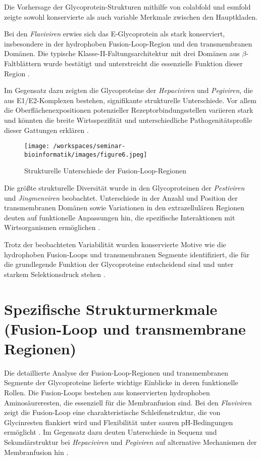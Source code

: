 Die Vorhersage der Glycoprotein-Strukturen mithilfe von \gls{colabfold} und \gls{esmfold} zeigte sowohl konservierte als auch variable Merkmale zwischen den Hauptkladen.

Bei den \textit{Flaviviren} erwies sich das E-Glycoprotein als stark konserviert, insbesondere in der hydrophoben Fusion-Loop-Region und den transmembranen Domänen. Die typische Klasse-II-Faltungsarchitektur mit drei Domänen aus $\beta$-Faltblättern wurde bestätigt und unterstreicht die essenzielle Funktion dieser Region \autocite{Modis2004}.

Im Gegensatz dazu zeigten die Glycoproteine der \textit{Hepaciviren} und \textit{Pegiviren}, die aus E1/E2-Komplexen bestehen, signifikante strukturelle Unterschiede. Vor allem die Oberflächenexpositionen potenzieller Rezeptorbindungsstellen variieren stark und könnten die breite Wirtsspezifität und unterschiedliche Pathogenitätsprofile dieser Gattungen erklären \autocite{Lavie2017}.

\begin{figure}[H]
    \centering
    \texttt{[image: /workspaces/seminar-bioinformatik/images/figure6.jpeg]}
    \caption{Strukturelle Unterschiede der Fusion-Loop-Regionen}
    \label{fig:figure6-orginal}
\end{figure}

Die größte strukturelle Diversität wurde in den Glycoproteinen der \textit{Pestiviren} und \textit{Jingmenviren} beobachtet. Unterschiede in der Anzahl und Position der transmembranen Domänen sowie Variationen in den extrazellulären Regionen deuten auf funktionelle Anpassungen hin, die spezifische Interaktionen mit Wirtsorganismen ermöglichen \autocite{Tautz2015}.

Trotz der beobachteten Variabilität wurden konservierte Motive wie die hydrophoben Fusion-Loops und transmembranen Segmente identifiziert, die für die grundlegende Funktion der Glycoproteine entscheidend sind und unter starkem Selektionsdruck stehen \autocite{Modis2004}.

\section{Spezifische Strukturmerkmale (Fusion-Loop und transmembrane Regionen)} \label{sec:spezifische-strukturmerkmale}

Die detaillierte Analyse der Fusion-Loop-Regionen und transmembranen Segmente der Glycoproteine lieferte wichtige Einblicke in deren funktionelle Rollen. Die Fusion-Loops bestehen aus konservierten hydrophoben Aminosäureresten, die essenziell für die Membranfusion sind. Bei den \textit{Flaviviren} zeigt die Fusion-Loop eine charakteristische Schleifenstruktur, die von Glycinresten flankiert wird und Flexibilität unter sauren pH-Bedingungen ermöglicht \autocite{Rey1995}. Im Gegensatz dazu deuten Unterschiede in Sequenz und Sekundärstruktur bei \textit{Hepaciviren} und \textit{Pegiviren} auf alternative Mechanismen der Membranfusion hin \autocite{Lavie2017}.

